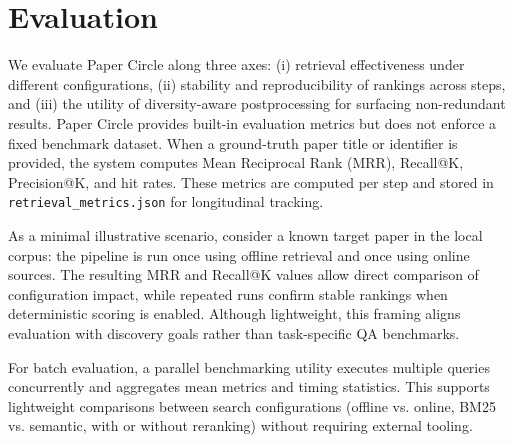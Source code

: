 \section{Evaluation}
We evaluate Paper Circle along three axes: (i) retrieval effectiveness under different configurations, (ii) stability and reproducibility of rankings across steps, and (iii) the utility of diversity-aware postprocessing for surfacing non-redundant results. Paper Circle provides built-in evaluation metrics but does not enforce a fixed benchmark dataset. When a ground-truth paper title or identifier is provided, the system computes Mean Reciprocal Rank (MRR), Recall@K, Precision@K, and hit rates. These metrics are computed per step and stored in \texttt{retrieval\_metrics.json} for longitudinal tracking.

As a minimal illustrative scenario, consider a known target paper in the local corpus: the pipeline is run once using offline retrieval and once using online sources. The resulting MRR and Recall@K values allow direct comparison of configuration impact, while repeated runs confirm stable rankings when deterministic scoring is enabled. Although lightweight, this framing aligns evaluation with discovery goals rather than task-specific QA benchmarks.

For batch evaluation, a parallel benchmarking utility executes multiple queries concurrently and aggregates mean metrics and timing statistics. This supports lightweight comparisons between search configurations (offline vs. online, BM25 vs. semantic, with or without reranking) without requiring external tooling.
